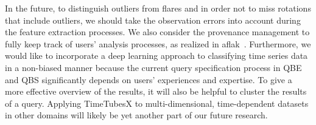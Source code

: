 In the future, 
to distinguish outliers from flares and in order not to miss rotations that include outliers,
we should take the observation errors into account during the feature extraction processes. 
We also consider the provenance management to fully keep track of users’ analysis processes, as realized in aflak~\cite{Boussejra2019}.
Furthermore, we would like to incorporate a deep learning approach to classifying time series data in a non-biased manner because the current query specification process in QBE and QBS significantly depends on users' experiences and expertise.
To give a more effective overview of the results, it will also be helpful to cluster the results of a query. %
Applying TimeTubesX to multi-dimensional, time-dependent datasets in other domains will likely be yet another part of our future research.